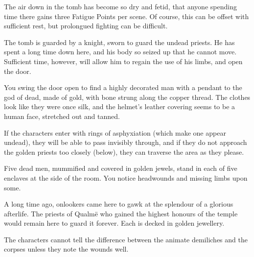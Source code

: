 \begin{multicols}{2}
The air down in the tomb has become so dry and fetid, that anyone spending time there gains three Fatigue Points per scene.  Of course, this can be offset with sufficient rest, but prolongued fighting can be difficult.

The tomb is guarded by a knight, sworn to guard the undead priests.  He has spent a long time down here, and his body so seized up that he cannot move.  Sufficient time, however, will allow him to regain the use of his limbs, and open the door.

\begin{boxtext}

	You swing the door open to find a highly decorated man with a pendant to the god of dead, made of gold, with bone strung along the copper thread.  The clothes look like they were once silk, and the helmet's leather covering seems to be a human face, stretched out and tanned.

\end{boxtext}





	If the characters enter with rings of asphyxiation (which make one appear undead), they will be able to pass invisibly through, and if they do not approach the golden priests too closely (below), they can traverse the area as they please.


\begin{boxtext}
	Five dead men, mummified and covered in golden jewels, stand in each of five enclaves at the side of the room.  You notice headwounds and missing limbs upon some.
\end{boxtext}

A long time ago, onlookers came here to gawk at the splendour of a glorious afterlife.  The priests of Qualm\"{e} who gained the highest honours of the temple would remain here to guard it forever.  Each is decked in golden jewellery.


\demilich

The characters cannot tell the difference between the animate demiliches and the corpses unless they note the wounds well.


\end{multicols}

